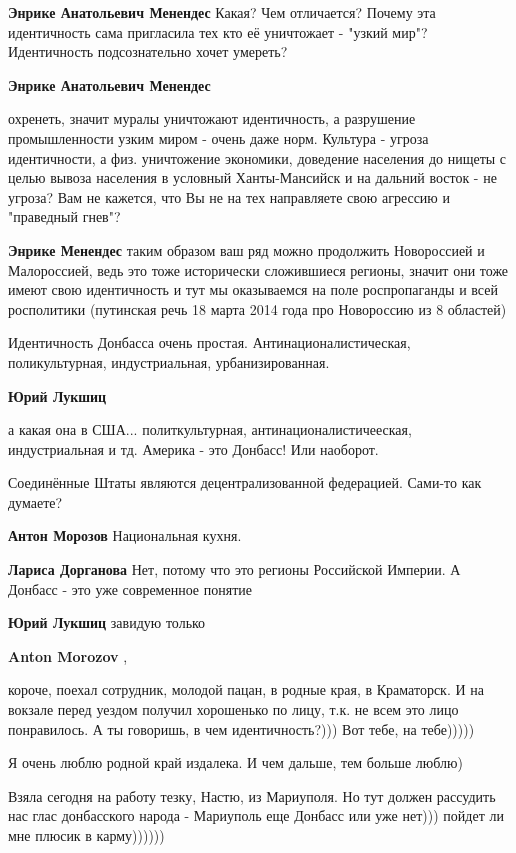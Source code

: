 \begin{itemize}
\begin{itemize}
\textbf{Энрике Анатольевич Менендес} Какая? Чем отличается? Почему эта идентичность сама пригласила тех кто её уничтожает - "узкий мир"? Идентичность подсознательно хочет умереть?

\textbf{Энрике Анатольевич Менендес} 

охренеть, значит муралы уничтожают идентичность, а разрушение промышленности
узким миром - очень даже норм. Культура - угроза идентичности, а
физ. уничтожение экономики, доведение населения до нищеты с целью вывоза
населения в условный Ханты-Мансийск и на дальний восток - не угроза? Вам не
кажется, что Вы не на тех направляете свою агрессию и "праведный гнев"?

\textbf{Энрике Менендес} таким образом ваш ряд можно продолжить Новороссией и Малороссией, ведь это тоже исторически сложившиеся регионы, значит они тоже имеют свою идентичность и тут мы оказываемся на поле роспропаганды и всей росполитики (путинская речь 18 марта 2014 года про Новороссию из 8 областей)


Идентичность Донбасса очень простая. Антинационалистическая, поликультурная,
индустриальная, урбанизированная.

\textbf{Юрий Лукшиц} 

а какая она в США... политкультурная, антинационалистичееская, индустриальная и
тд. Америка - это Донбасс! Или наоборот.

Соединённые Штаты являются децентрализованной федерацией. Сами-то как думаете?

\textbf{Антон Морозов} Национальная кухня.

\textbf{Лариса Дорганова} Нет, потому что это регионы Российской Империи. А Донбасс - это уже современное понятие

\textbf{Юрий Лукшиц} завидую только

\textbf{Anton Morozov} , 

короче, поехал сотрудник, молодой пацан, в родные края, в Краматорск. И на
вокзале перед уездом получил хорошенько по лицу, т.к. не всем это лицо
понравилось. А ты говоришь, в чем идентичность?))) Вот тебе, на тебе)))))

Я очень люблю родной край издалека. И чем дальше, тем больше люблю)

Взяла сегодня на работу тезку, Настю, из Мариуполя. Но тут должен рассудить нас
глас донбасского народа - Мариуполь еще Донбасс или уже нет))) пойдет ли мне
плюсик в карму))))))


\end{itemize}
\end{itemize}
